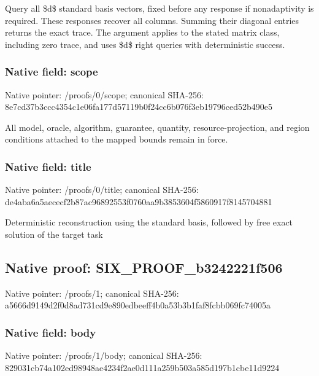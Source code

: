 \documentclass[10pt,a4paper]{article}
\begin{document}
\begingroup\raggedright\sloppy Query all \$d\$ standard basis vectors,\allowbreak{} fixed before any response if nonadaptivity is required. These responses recover all columns. Summing their diagonal entries returns the exact trace. The argument applies to the stated matrix class,\allowbreak{} including zero trace,\allowbreak{} and uses \$d\$ right queries with deterministic success.\par\endgroup

\subsubsection{Native field: scope}
Native pointer: /proofs/0/scope; canonical SHA-256: 8e7cd37b3ccc4354c1e06fa177d57119b0f24cc6b076f3eb19796ced52b490e5

\begingroup\raggedright\sloppy All model,\allowbreak{} oracle,\allowbreak{} algorithm,\allowbreak{} guarantee,\allowbreak{} quantity,\allowbreak{} resource-projection,\allowbreak{} and region conditions attached to the mapped bounds remain in force.\par\endgroup

\subsubsection{Native field: title}
Native pointer: /proofs/0/title; canonical SHA-256: de4aba6a5aececf2b87ac96892553f0760aa9b3853604f5860917f8145704881

\begingroup\raggedright\sloppy Deterministic reconstruction using the standard basis,\allowbreak{} followed by free exact solution of the target task\par\endgroup

\subsection{Native proof: SIX\_\allowbreak{}PROOF\_\allowbreak{}b3242221f506}
Native pointer: /proofs/1; canonical SHA-256: a5666d9149d2f0d8ad731cd9e890edbeeff4b0a53b3b1faf8fcbb069fc74005a

\subsubsection{Native field: body}
Native pointer: /proofs/1/body; canonical SHA-256: 829031cb74a102ed98948ae4234f2ae0d111a259b503a585d197b1cbe11d9224
\end{document}
